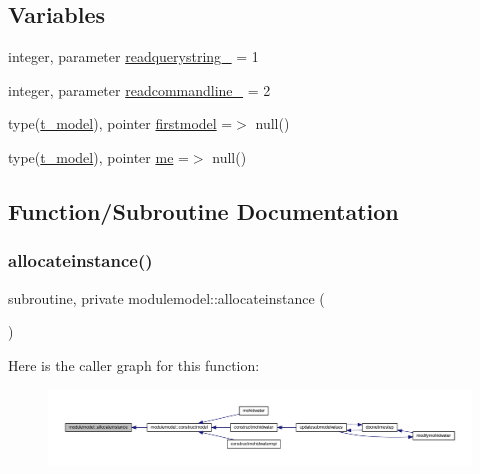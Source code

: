 \subsection*{Variables}
\begin{DoxyCompactItemize}
\item 
integer, parameter \mbox{\hyperlink{namespacemodulemodel_a9d28e193fe25ac78b7f97d328ea3d7f4}{readquerystring\+\_\+}} = 1
\item 
integer, parameter \mbox{\hyperlink{namespacemodulemodel_a58d33da3b782f55628340bd21722de76}{readcommandline\+\_\+}} = 2
\item 
type(\mbox{\hyperlink{structmodulemodel_1_1t__model}{t\+\_\+model}}), pointer \mbox{\hyperlink{namespacemodulemodel_ac561b0a5644fa2248aaefbf844e5a4aa}{firstmodel}} =$>$ null()
\item 
type(\mbox{\hyperlink{structmodulemodel_1_1t__model}{t\+\_\+model}}), pointer \mbox{\hyperlink{namespacemodulemodel_a98337e796a74b39490b015ac045f4570}{me}} =$>$ null()
\end{DoxyCompactItemize}


\subsection{Function/\+Subroutine Documentation}
\mbox{\label{namespacemodulemodel_a5bbc8de2114f1ac7367a9db6d923e85a}} 
\subsubsection{\texorpdfstring{allocateinstance()}{allocateinstance()}}
{\footnotesize\ttfamily subroutine, private modulemodel\+::allocateinstance (\begin{DoxyParamCaption}{ }\end{DoxyParamCaption})\hspace{0.3cm}{\ttfamily [private]}}

Here is the caller graph for this function\+:\nopagebreak
\begin{figure}[H]
\begin{center}
\leavevmode
\includegraphics[width=350pt]{namespacemodulemodel_a5bbc8de2114f1ac7367a9db6d923e85a_icgraph}
\end{center}
\end{figure}
\mbox{\label{namespacemodulemodel_a26ba9ff74ca1066f7a87bd019c76b1ed}} 
